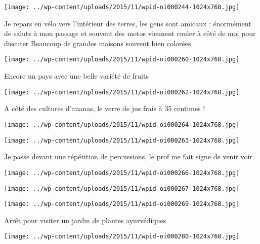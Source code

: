  \newline
\centerline{\texttt{[image: ../wp-content/uploads/2015/11/wpid-oi000244-1024x768.jpg]} } 
 \newline
 Je repars en vélo vers l'intérieur des terres, les gens sont amicaux : énormément de saluts à mon passage et souvent des motos viennent rouler à côté de moi pour discuter \newline
 Beaucoup de grandes maisons souvent bien colorées \newline
 \newline
\centerline{\texttt{[image: ../wp-content/uploads/2015/11/wpid-oi000260-1024x768.jpg]} } 
 \newline
 Encore un pays avec une belle variété de fruits \newline
 \newline
\centerline{\texttt{[image: ../wp-content/uploads/2015/11/wpid-oi000262-1024x768.jpg]} } 
 \newline
 A côté des cultures d'ananas, le verre de jus frais à 35 centimes ! \newline
 \newline
\centerline{\texttt{[image: ../wp-content/uploads/2015/11/wpid-oi000264-1024x768.jpg]} } 
 \newline
 \newline
\centerline{\texttt{[image: ../wp-content/uploads/2015/11/wpid-oi000263-1024x768.jpg]} } 
 \newline
 Je passe devant une répétition de percussions, le prof me fait signe de venir voir \newline
 \newline
\centerline{\texttt{[image: ../wp-content/uploads/2015/11/wpid-oi000266-1024x768.jpg]} } 
 \newline
 \newline
\centerline{\texttt{[image: ../wp-content/uploads/2015/11/wpid-oi000267-1024x768.jpg]} } 
 \newline
 \newline
\centerline{\texttt{[image: ../wp-content/uploads/2015/11/wpid-oi000269-1024x768.jpg]} } 
 \newline
 Arrêt pour visiter un jardin de plantes ayurvédiques \newline
 \newline
\centerline{\texttt{[image: ../wp-content/uploads/2015/11/wpid-oi000280-1024x768.jpg]} } 
 \newline
